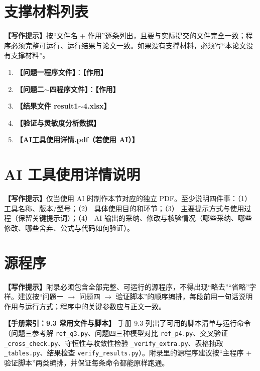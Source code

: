 \documentclass[12pt,a4paper]{article}
\newcommand{\prompt}[1]{\par\noindent\textbf{【写作提示】}#1\par}      %
\newcommand{\ph}[1]{\textbf{【#1】}}                                   %
\newcommand{\handbook}[2]{\par\noindent\textbf{【手册索引：#1】} #2\par}
\begin{document}
\clearpage
\appendix

\section{支撑材料列表}

\prompt{按“文件名 + 作用”逐条列出，且要与实际提交的文件完全一致；程序必须完整可运行、运行结果与论文一致。如果没有支撑材料，必须写“本论文没有支撑材料”。}

\begin{enumerate}[label=(\arabic*)]
  \item \ph{问题一程序文件}：\ph{作用}
  \item \ph{问题二$\sim$四程序文件}：\ph{作用}
  \item \ph{结果文件 result1$\sim$4.xlsx}
  \item \ph{验证与灵敏度分析数据}
  \item \ph{AI工具使用详情.pdf（若使用 AI）}
\end{enumerate}

\section{AI 工具使用详情说明}

\prompt{仅当使用 AI 时制作本节对应的独立 PDF。至少说明四件事：（1） 工具名称、版本/型号；（2） 具体使用目的和环节；（3） 主要提示方式与使用过程（保留关键提示词）；（4） AI 输出的采纳、修改与核验情况（哪些采纳、哪些修改、哪些舍弃、公式与代码如何验证）。}

\section{源程序}

\prompt{附录必须包含全部完整、可运行的源程序，不得出现“略去”“省略”字样。建议按“问题一 $\rightarrow$ 问题四 $\rightarrow$ 验证脚本”的顺序编排，每段前用一句话说明作用与运行方式；程序中的关键参数应与正文一致。}

\handbook{9.3 常用文件与脚本}{手册 9.3 列出了可用的脚本清单与运行命令（问题三参考解 \texttt{ref\_q3.py}、问题四三种模型对比 \texttt{ref\_p4.py}、交叉验证 \texttt{\_cross\_check.py}、守恒性与收敛性检验 \texttt{\_verify\_extra.py}、表格抽取 \texttt{\_tables.py}、结果检查 \texttt{verify\_results.py}）。附录里的源程序建议按“主程序 + 验证脚本”两类编排，并保证每条命令都能原样跑通。}
\end{document}

